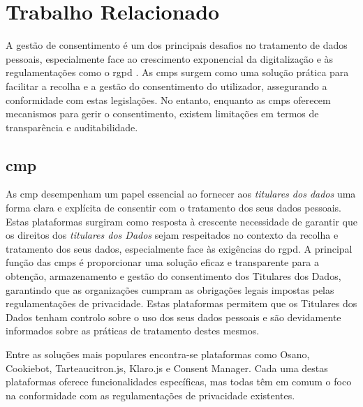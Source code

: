 \chapter{Trabalho Relacionado}
\label{cap:relacionado}

A gestão de consentimento é um dos principais desafios no tratamento de dados pessoais, especialmente face ao crescimento exponencial da digitalização e às regulamentações como o \acrshort{rgpd} \citep{gdpr}.
As \acrshort{cmp}s surgem como uma solução prática para facilitar a recolha e a gestão do consentimento do utilizador, assegurando a conformidade com estas legislações. No entanto, enquanto as \acrshort{cmp}s oferecem mecanismos para gerir o consentimento, existem limitações em termos de transparência e auditabilidade.

\section{\texorpdfstring{\acrfull{cmp}}{CMP}}

As \acrfull{cmp} desempenham um papel essencial ao fornecer aos \textit{titulares dos dados} uma forma clara e explícita de consentir com o tratamento dos seus dados pessoais. Estas plataformas surgiram como resposta à crescente necessidade de garantir que os direitos dos \textit{titulares dos Dados} sejam respeitados no contexto da recolha e tratamento dos seus dados, especialmente face às exigências do \acrshort{rgpd}. A principal função das \acrshort{cmp}s é proporcionar uma solução eficaz e transparente para a obtenção, armazenamento e gestão do consentimento dos Titulares dos Dados, garantindo que as organizações cumpram as obrigações legais impostas pelas regulamentações de privacidade. Estas plataformas permitem que os Titulares dos Dados tenham controlo sobre o uso dos seus dados pessoais e são devidamente informados sobre as práticas de tratamento destes mesmos.

Entre as soluções mais populares encontra-se plataformas como Osano, Cookiebot, Tarteaucitron.js, Klaro.js e Consent Manager. Cada uma destas plataformas oferece funcionalidades específicas, mas todas têm em comum o foco na conformidade com as regulamentações de privacidade existentes.

